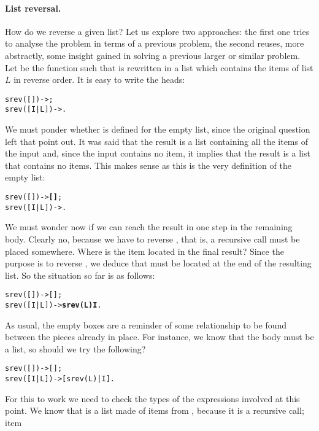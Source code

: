 \medskip

\paragraph{List reversal.}

How do we reverse a given list? Let us explore two approaches: the
first one tries to analyse the problem in terms of a previous problem,
the second reuses, more abstractly, some insight gained in solving a
previous larger or similar problem. Let  be the
function such that  is rewritten in a list which
contains the items of list \(L\) in reverse order. It is easy to write
the heads:
\begin{alltt}
srev(   []) -> ;
srev([I|L]) -> .
\end{alltt}
We must ponder whether  is defined for the empty list,
since the original question left that point out. It was said that the
result is a list containing all the items of the input and, since the
input contains no item, it implies that the result is a list that
contains no items. This makes sense as this is the very definition of
the empty list:
\begin{alltt}
srev(   []) -> \textbf{[]};
srev([I|L]) -> .
\end{alltt}
We must wonder now if we can reach the result in one step in the
remaining body. Clearly no, because we have to reverse ,
that is, a recursive call  must be placed
somewhere. Where is the item  located in the final result?
Since the purpose is to reverse \erlcode{[I|L]}, we deduce that
 must be located at the end of the resulting list. So the
situation so far is as follows:
\begin{alltt}
srev(   []) -> [];
srev([I|L]) ->  \textbf{srev(L)}  \textbf{I} .
\end{alltt}
As usual, the empty boxes are a reminder of some relationship to be
found between the pieces already in place. For instance, we know that
the body must be a list, so should we try the following?
\begin{alltt}
srev(   []) -> [];
srev([I|L]) -> [srev(L) | I].\hfill% \emph{Hmm...}
\end{alltt}
For this to work we need to check the types of the expressions
involved at this point. We know that  is a list made
of items from , because it is a recursive call; item
